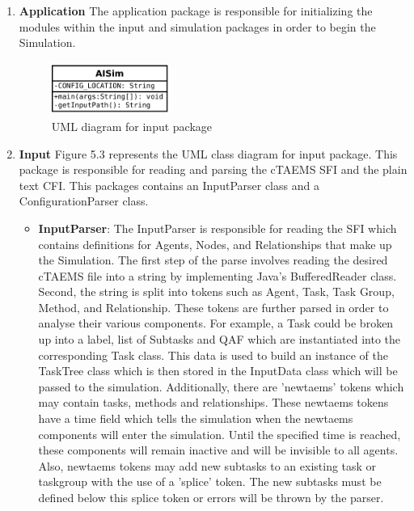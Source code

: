 \begin{enumerate}

\item \textbf{Application}  The application package is responsible for initializing the modules within the input and simulation packages in order to begin the Simulation.

\begin{figure}[H]
\centering
\includegraphics[width=1.5in]{figs/applicationUML}
\caption{UML diagram for input package}
\label{fig:input}
\end{figure}

\item \textbf{Input} Figure 5.3 represents the UML class diagram for input package. This package is responsible for reading and parsing the cTAEMS SFI and the plain text CFI. This packages contains an InputParser class and a ConfigurationParser class. \\

\begin{itemize}
\item \textbf{InputParser}: The InputParser is responsible for reading the SFI which contains definitions for Agents, Nodes, and Relationships that make up the Simulation. The first step of the parse involves reading the desired cTAEMS file into a string by implementing Java's BufferedReader class. Second, the string is split into tokens such as Agent, Task, Task Group, Method, and Relationship. These tokens are further parsed in order to analyse their various components. For example, a Task could be broken up into a label, list of Subtasks and QAF which are instantiated into the corresponding Task class. This data is used to build an instance of the TaskTree class which is then stored in the InputData class which will be passed to the simulation. Additionally, there are 'newtaems' tokens which may contain tasks, methods and relationships. These newtaems tokens have a time field which tells the simulation when the newtaems components will enter the simulation. Until the specified time is reached, these components will remain inactive and will be invisible to all agents. Also, newtaems tokens may add new subtasks to an existing task or taskgroup with the use of a 'splice' token. The new subtasks must be defined below this splice token or errors will be thrown by the parser. \\


\end{itemize}
\end{enumerate}
